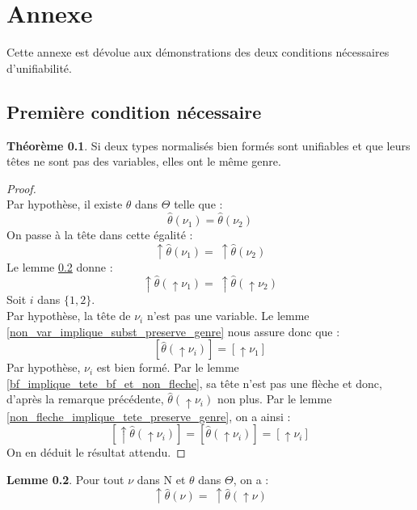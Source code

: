 \documentclass[a4paper]{report}
\newenvironment{preuve} 
  {\begin{proof}~\\} 
  {\end{proof}}
\theoremstyle{definition}
\newtheorem{theoreme}{Théorème}
\newtheorem{lemme}[theoreme]{Lemme}
\newcommand{\N}{\mathrm{N}}
\begin{document}
\chapter*{Annexe}

Cette annexe est dévolue aux démonstrations des deux conditions nécessaires d'unifiabilité.


\section{Première condition nécessaire}

\begin{theoreme} \label{thm_cond1}
  Si deux types normalisés bien formés sont unifiables et que leurs têtes ne sont pas des variables, elles ont le même genre.
\end{theoreme}

\begin{preuve}
  Par hypothèse, il existe $\theta$ dans $\Theta$ telle que :
  \[ \hat\theta (\nu_1) = \hat\theta (\nu_2) \]
  On passe à la tête dans cette égalité :
  \[ \uparrow \hat\theta (\nu_1) =\ \uparrow \hat\theta (\nu_2) \]
  Le lemme \ref{tete_subst_eq_tete_subst_tete} donne :
  \[ \uparrow \hat\theta (\uparrow \nu_1) =\ \uparrow \hat\theta (\uparrow \nu_2) \]
  Soit $i$ dans $\{ 1, 2 \}$. \\
  Par hypothèse, la tête de $\nu_i$ n'est pas une variable. Le lemme \ref{non_var_implique_subst_preserve_genre} nous assure donc que :
  \[ [ \hat\theta (\uparrow \nu_i) ] = [ \uparrow \nu_1 ] \]
  Par hypothèse, $\nu_i$ est bien formé. Par le lemme \ref{bf_implique_tete_bf_et_non_fleche}, sa tête n'est pas une flèche et donc, d'après la remarque précédente, $\hat\theta (\uparrow \nu_i)$ non plus. Par le lemme \ref{non_fleche_implique_tete_preserve_genre}, on a ainsi :
  \[ [ \uparrow \hat\theta (\uparrow \nu_i) ] = [ \hat\theta (\uparrow \nu_i) ] = [ \uparrow \nu_i ] \]
  On en déduit le résultat attendu.
\end{preuve}

\begin{lemme} \label{tete_subst_eq_tete_subst_tete}
  Pour tout $\nu$ dans $\N$ et $\theta$ dans $\Theta$, on a :
  \[ \uparrow \hat\theta (\nu) =\ \uparrow \hat\theta (\uparrow \nu) \]
\end{lemme}
\end{document}
